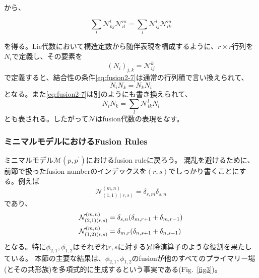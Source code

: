 \documentclass[11pt, aps, longbibliography]{article}
\numberwithin{equation}{section}
\begin{document}
        から、
        \begin{tcolorbox}
            \begin{equation}\label{eq:fusion2-7}
                \sum_{l} \mathcal{N}_{kj}^l \mathcal{N}_{il}^m = \sum_{l}\mathcal{N}_{ij}^l \mathcal{N}_{lk}^m
            \end{equation}
        \end{tcolorbox}
        を得る。Lie代数において構造定数から随伴表現を構成するように、$r\times r$行列を$N_i$で定義し、その要素を
        \begin{equation}\label{eq:fusion2-8}
            (N_i)_{j,k} = \mathcal{N}_{ij}^k
        \end{equation}
        で定義すると、結合性の条件\eqref{eq:fusion2-7}は通常の行列積で言い換えられて、
        \begin{equation}\label{eq:fusion2-9}
            N_i N_k = N_k N_i
        \end{equation}
        となる。また\eqref{eq:fusion2-7}は別のようにも書き換えられて、
        \begin{equation}\label{eq:fusion2-10}
            N_iN_k = \sum_{l} \mathcal{N}_{ik}^l N_l
        \end{equation}
        とも表される。したがって$\mathcal{N}$はfusion代数の表現をなす。

        \subsubsection{ミニマルモデルにおけるFusion Rules}
        ミニマルモデル$\mathcal{M}(p,p^\prime)$におけるfusion ruleに戻ろう。
        混乱を避けるために、前節で扱ったfusion numberのインデックスを$(r,s)$でしっかり書くことにする。例えば
        \begin{equation}\label{eq:fusion3-1}
            \mathcal{N}_{(1,1)(r,s)}^{(m,n)} = \delta_{r,m}\delta_{s,n}
        \end{equation}
        であり、
        \begin{align}\label{eq:fusion3-2}
            \mathcal{N}_{(2,1)(r,s)}^{(m,n)} &= \delta_{s,n} (\delta_{m,r+1} + \delta_{m,r-1}) \notag \\
            \mathcal{N}_{(1,2)(r,s)}^{(m,n)} &= \delta_{m,r} (\delta_{n,s+1} + \delta_{n,s-1})
        \end{align}
        となる。特に$\phi_{2,1},\phi_{1,2}$はそれぞれ$r,s$に対する昇降演算子のような役割を果たしている。
        本節の主要な結果は、$\phi_{2,1},\phi_{1,2}$のfusionが他のすべてのプライマリー場(とその共形族)を多項式的に生成するという事実である(Fig.~\ref{fig3})。
\end{document}
